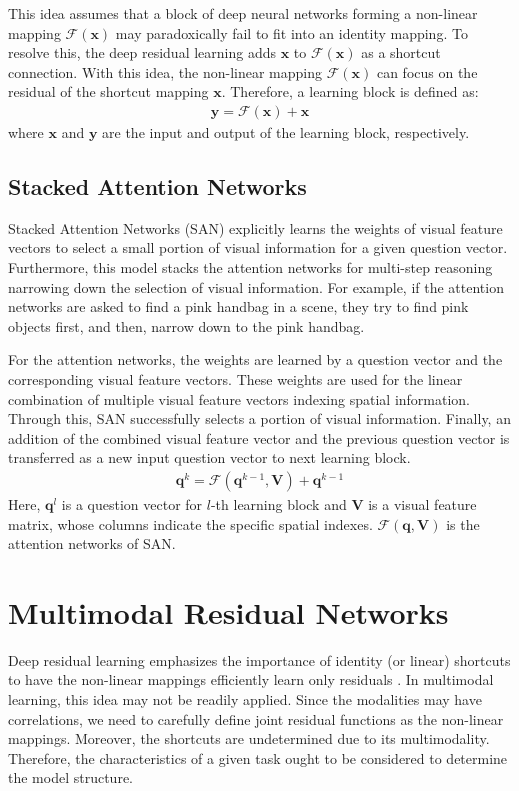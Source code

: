 \documentclass{article}
\newcommand{\vx}[0]{\mathbf{x}}
\newcommand{\vy}[0]{\mathbf{y}}
\newcommand{\vq}[0]{\mathbf{q}}
\newcommand{\mV}[0]{\mathbf{V}}
\begin{document}
This idea assumes that a block of deep neural networks forming a non-linear mapping $\mathcal{F}(\vx)$ may paradoxically fail to fit into an identity mapping. To resolve this, the deep residual learning adds $\vx$ to $\mathcal{F}(\vx)$ as a shortcut connection. With this idea, the non-linear mapping $\mathcal{F}(\vx)$ can focus on the residual of the shortcut mapping $\vx$. Therefore, a learning block is defined as: \begin{align}
  \vy = \mathcal{F}(\vx) + \vx
\end{align}
where $\vx$ and $\vy$ are the input and output of the learning block, respectively.

\subsection{Stacked Attention Networks}

Stacked Attention Networks (SAN) \cite{Yang2015} explicitly learns the weights of visual feature vectors to select a small portion of visual information for a given question vector. Furthermore, this model stacks the attention networks for multi-step reasoning narrowing down the selection of visual information. For example, if the attention networks are asked to find a pink handbag in a scene, they try to find pink objects first, and then, narrow down to the pink handbag. 

For the attention networks, the weights are learned by a question vector and the corresponding visual feature vectors. These weights are used for the linear combination of multiple visual feature vectors indexing spatial information. Through this, SAN successfully selects a portion of visual information. Finally, an addition of the combined visual feature vector and the previous question vector is transferred as a new input question vector to next learning block. \begin{align}
  \vq^{k} = \mathcal{F}(\vq^{k-1}, \mV) + \vq^{k-1}
\end{align}
Here, $\vq^{l}$ is a question vector for $l$-th learning block and $\mV$ is a visual feature matrix, whose columns indicate the specific spatial indexes. $\mathcal{F}(\vq,\mV)$ is the attention networks of SAN.

\section{Multimodal Residual Networks}
\label{sec:MRN}

Deep residual learning emphasizes the importance of identity (or linear) shortcuts to have the non-linear mappings efficiently learn only residuals \cite{He2015}. In multimodal learning, this idea may not be readily applied. Since the modalities may have correlations, we need to carefully define joint residual functions as the non-linear mappings. Moreover, the shortcuts are undetermined due to its multimodality. Therefore, the characteristics of a given task ought to be considered to determine the model structure.
\end{document}

